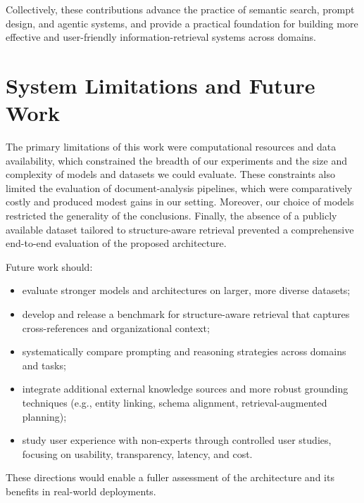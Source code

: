 Collectively, these contributions advance the practice of semantic search, prompt design, and agentic systems, and provide a practical foundation for building more effective and user-friendly information-retrieval systems across domains.
\section{System Limitations and Future Work}
The primary limitations of this work were computational resources and data availability, which constrained the breadth of our experiments and the size and complexity of models and datasets we could evaluate. These constraints also limited the evaluation of document-analysis pipelines, which were comparatively costly and produced modest gains in our setting. Moreover, our choice of models restricted the generality of the conclusions. Finally, the absence of a publicly available dataset tailored to structure-aware retrieval prevented a comprehensive end-to-end evaluation of the proposed architecture.

Future work should:
\begin{itemize}
	\item evaluate stronger models and architectures on larger, more diverse datasets;
	\item develop and release a benchmark for structure-aware retrieval that captures cross-references and organizational context;
	\item systematically compare prompting and reasoning strategies across domains and tasks;
	\item integrate additional external knowledge sources and more robust grounding techniques (e.g., entity linking, schema alignment, retrieval-augmented planning);
	\item study user experience with non-experts through controlled user studies, focusing on usability, transparency, latency, and cost.
\end{itemize}

These directions would enable a fuller assessment of the architecture and its benefits in real-world deployments.



